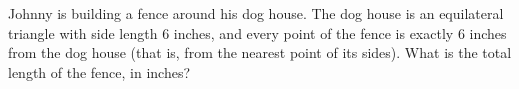 Johnny is building a fence around his dog house. The dog house is an equilateral triangle with side length $6$ inches, and every point of the fence is exactly $6$ inches from the dog house (that is, from the nearest point of its sides). What is the total length of the fence, in inches?

